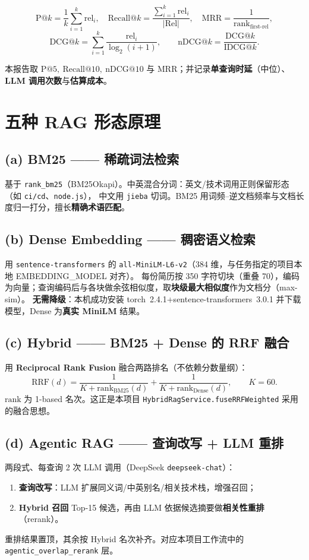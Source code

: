 \documentclass[11pt,a4paper,fontset=windows]{ctexart}
\begin{document}
\[
\text{P@}k=\frac{1}{k}\sum_{i=1}^{k}\mathrm{rel}_i,\quad
\text{Recall@}k=\frac{\sum_{i=1}^{k}\mathrm{rel}_i}{|\text{Rel}|},\quad
\text{MRR}=\frac{1}{\mathrm{rank}_{\text{first-rel}}},
\]
\[
\text{DCG@}k=\sum_{i=1}^{k}\frac{\mathrm{rel}_i}{\log_2(i+1)},\qquad
\text{nDCG@}k=\frac{\text{DCG@}k}{\text{IDCG@}k}.
\]

本报告取 $\text{P@}5,\ \text{Recall@}10,\ \text{nDCG@}10$ 与 MRR；并记录\textbf{单查询时延}（中位）、\textbf{LLM 调用次数}与\textbf{估算成本}。

\section{五种 RAG 形态原理}
\label{sec:methods}

\subsection{(a) BM25 —— 稀疏词法检索}
基于 \texttt{rank\_bm25}（BM25Okapi）。中英混合分词：英文/技术词用正则保留形态（如 \texttt{ci/cd}、\texttt{node.js}），
中文用 \texttt{jieba} 切词。BM25 用词频–逆文档频率与文档长度归一打分，擅长\textbf{精确术语匹配}。

\subsection{(b) Dense Embedding —— 稠密语义检索}
用 \texttt{sentence-transformers} 的 \texttt{all-MiniLM-L6-v2}（384 维，与任务指定的项目本地 EMBEDDING\_MODEL 对齐）。
每份简历按 350 字符切块（重叠 70），编码为向量；查询编码后与各块做余弦相似度，取\textbf{块级最大相似度}作为文档分（max-sim）。
\textbf{无需降级}：本机成功安装 torch~2.4.1+sentence-transformers~3.0.1 并下载模型，Dense 为\textbf{真实 MiniLM} 结果。

\subsection{(c) Hybrid —— BM25 + Dense 的 RRF 融合}
用 \textbf{Reciprocal Rank Fusion} 融合两路排名（不依赖分数量纲）：
\[
\text{RRF}(d)=\frac{1}{K+\mathrm{rank}_{\text{BM25}}(d)}+\frac{1}{K+\mathrm{rank}_{\text{Dense}}(d)},\qquad K=60.
\]
$\mathrm{rank}$ 为 1-based 名次。这正是本项目 \texttt{HybridRagService.fuseRRFWeighted} 采用的融合思想。

\subsection{(d) Agentic RAG —— 查询改写 + LLM 重排}
两段式、每查询 2 次 LLM 调用（DeepSeek \texttt{deepseek-chat}）：
\begin{enumerate}
\item \textbf{查询改写}：LLM 扩展同义词/中英别名/相关技术栈，增强召回；
\item \textbf{Hybrid 召回} Top-15 候选，再由 LLM 依据候选摘要做\textbf{相关性重排}（rerank）。
\end{enumerate}
重排结果置顶，其余按 Hybrid 名次补齐。对应本项目工作流中的 \texttt{agentic\_overlap\_rerank} 层。
\end{document}
